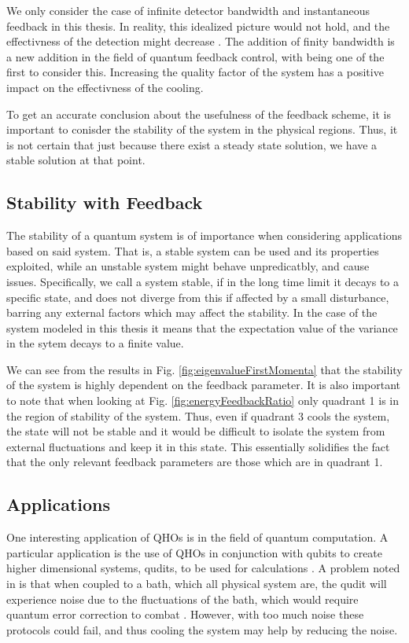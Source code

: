 We only consider the case of infinite detector bandwidth and instantaneous feedback in this thesis. In reality, this idealized picture would not hold, and the effectivness of the detection might decrease \cite{Annby-Andersson:2024}. The addition of finity bandwidth is a new addition in the field of quantum feedback control, with \cite{De-Sousa:2025} being one of the first to consider this. 
Increasing the quality factor of the system has a positive impact on the effectivness of the cooling.

To get an accurate conclusion about the usefulness of the feedback scheme, it is important to conisder the stability of the system in the physical regions. Thus, it is not certain that just because there exist a steady state solution, we have a stable solution at that point.



\subsection{Stability with Feedback}
The stability of a quantum system is of importance when considering applications based on said system. That is, a stable system can be used and its properties exploited, while an unstable system might behave unpredicatbly, and cause issues. Specifically, we call a system stable, if in the long time limit it decays to a specific state, and does not diverge from this if affected by a small disturbance, barring any external factors which may affect the stability. In the case of the system modeled in this thesis it means that the expectation value of the variance in the sytem decays to a finite value.

We can see from the results in Fig. \ref{fig:eigenvalueFirstMomenta} that the stability of the system is highly dependent on the feedback parameter. It is also important to note that when looking at Fig. \ref{fig:energyFeedbackRatio} only quadrant 1 is in the region of stability of the system. Thus, even if quadrant 3 cools the system, the state will not be stable and it would be difficult to isolate the system from external fluctuations and keep it in this state. This essentially solidifies the fact that the only relevant feedback parameters are those which are in quadrant 1. 


\subsection{Applications}
One interesting application of QHOs is in the field of quantum computation. A particular application is the use of QHOs in conjunction with qubits to create higher dimensional systems, qudits, to be used for calculations \cite{Liu:2021}. A problem noted in \cite{Liu:2021} is that when coupled to a bath, which all physical system are, the qudit will experience noise due to the fluctuations of the bath, which would require quantum error correction to combat \cite{Liu:2021}. However, with too much noise these protocols could fail, and thus cooling the system may help by reducing the noise.

